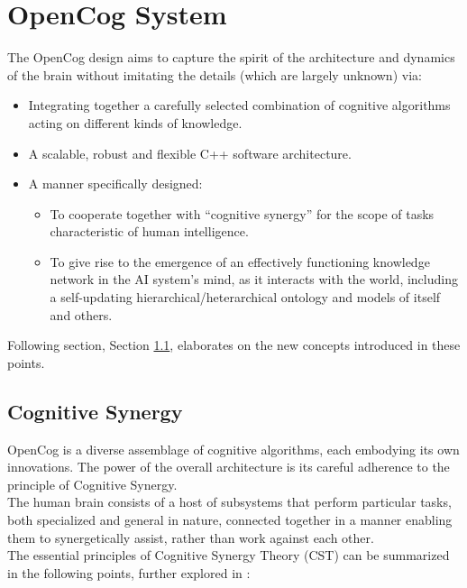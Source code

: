 \chapter{OpenCog System} \label{cha:opencog_system}

The OpenCog design aims to capture the spirit of the architecture and dynamics of the brain without imitating the details (which are largely unknown) via:
\begin{itemize}
	\item Integrating together a carefully selected combination of cognitive algorithms acting on different kinds of knowledge.
	\item A scalable, robust and flexible C++ software architecture.
	\item A manner specifically designed:
	\begin{itemize}	
	\item To cooperate together with “cognitive synergy” for the scope of tasks characteristic of human intelligence. 
	\item To give rise to the emergence of an effectively functioning knowledge network in the AI system’s mind, as it interacts with the world, including a self-updating hierarchical/heterarchical ontology and models of itself and others.
	\end{itemize}
\end{itemize}
Following section, Section \ref{sec:cognitive_synergy}, elaborates on the new concepts introduced in these points.


\section{Cognitive Synergy}\label{sec:cognitive_synergy}  %

OpenCog is a diverse assemblage of cognitive algorithms, each embodying its own innovations. The power of the overall architecture is its careful adherence to the principle of Cognitive Synergy. \\
The human brain consists of a host of subsystems that perform particular tasks, both specialized and general in nature, connected together in a manner enabling them to synergetically assist, rather than work against each other. \\
The essential principles of Cognitive Synergy Theory (CST) can be summarized in the following points, further explored in \cite{inproceedings_cognitive_synergy}:

